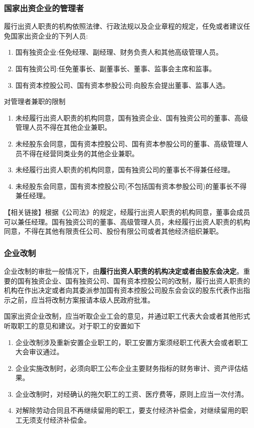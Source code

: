 \documentclass[UTF8,12pt]{ctexart}
\numberwithin{equation}{section} %
\numberwithin{figure}{section}
\numberwithin{table}{section}
\begin{document}
	\subsubsection{国家出资企业的管理者}
	
	履行出资人职责的机构依照法律、行政法规以及企业章程的规定，任免或者建议任免国家出资企业的下列人员:
	\begin{enumerate}
		\item 国有独资企业:任免经理、副经理、财务负责人和其他高级管理人员。
		
		\item 国有独资公司:任免董事长、副董事长、董事、监事会主席和监事。
		
		\item 国有资本控股公司、国有资本参股公司:向股东会提出董事、监事人选。
	\end{enumerate}
	
	对管理者兼职的限制
	\begin{enumerate}
		\item 未经履行出资人职责的机构同意，国有独资企业、国有独资公司的董事、高级管理人员不得在其他企业兼职。
		
		\item 未经股东会同意，国有资本控股公司、国有资本参股公司的董事、高级管理人员不得在经营同类业务的其他企业兼职。
		
		\item 未经履行出资人职责的机构同意，国有独资公司的董事长不得兼任经理。
		
		\item 未经股东会同意，国有资本控股公司(不包括国有资本参股公司)的董事长不得兼任经理。
	\end{enumerate}
	【相关链接】根据《公司法》的规定，经履行出资人职责的机构同意，董事会成员可以兼任经理。国有独资公司的董事、高级管理人员，未经履行出资人职责的机构同意，不得在其他有限责任公司、股份有限公司或者其他经济组织兼职。
	
	\subsubsection{企业改制}
	企业改制的审批一般情况下，由\textbf{履行出资人职责的机构决定或者由股东会决定}。重要的国有独资企业、国有独资公司、国有资本控股公司的改制，履行出资人职责的机构在作出决定或者向其委派参加国有资本控股公司股东会会议的股东代表作出指示之前，应当将改制方案报请本级人民政府批准。
	
	国家出资企业改制，应当听取企业工会的意见，并通过职工代表大会或者其他形式听取职工的意见和建议。对于职工的安置如下
	\begin{enumerate}
		\item 企业改制涉及重新安置企业职工的，职工安置方案须经职工代表大会或者职工大会审议通过。
		
		\item 企业实施改制时，必须向职工公布企业主要财务指标的财务审计、资产评估结果。
		
		\item 企业改制时，对经确认的拖欠职工的工资、医疗费等，原则上应当一次付清。
		
		\item 对解除劳动合同且不再继续留用的职工，要支付经济补偿金，对继续留用的职工无须支付经济补偿金。
	\end{enumerate}
	
\end{document}
